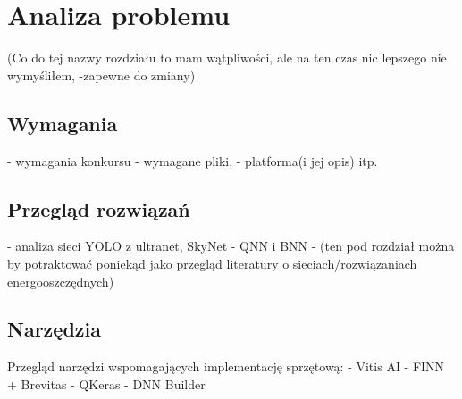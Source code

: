 \chapter{Analiza problemu}
\label{cha:Analiza probemu}
(Co do tej nazwy rozdziału to mam wątpliwości, 
ale na ten czas nic lepszego nie wymyśliłem,
-zapewne do zmiany)

\section{Wymagania}
- wymagania konkursu
- wymagane pliki,
- platforma(i jej opis) itp.

\section{Przegląd rozwiązań}
- analiza sieci YOLO z ultranet, SkyNet
- QNN i BNN
- (ten pod rozdział można by potraktować poniekąd jako przegląd literatury o sieciach/rozwiązaniach energooszczędnych)

\section{Narzędzia}
Przegląd narzędzi wspomagających implementację sprzętową:
- Vitis AI
- FINN + Brevitas
- QKeras
- DNN Builder




    

